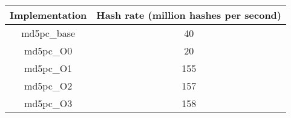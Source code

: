 
\begin{tabular}{c|c}
\hline
Implementation & Hash rate (million hashes per second) \\
\hline
md5pc\_base & 40 \\
md5pc\_O0 & 20 \\
md5pc\_O1 & 155 \\
md5pc\_O2 & 157 \\
md5pc\_O3 & 158 \\
\hline
\end{tabular}
